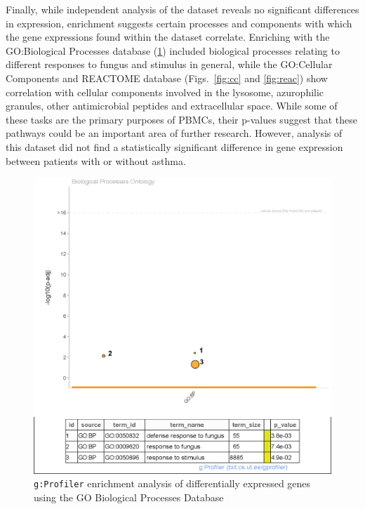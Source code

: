 \documentclass[pdflatex,sn-mathphys]{sn-jnl}%
\theoremstyle{thmstyleone}%
\theoremstyle{thmstyletwo}%
\newcommand{\betterref}[1]{\IfBeginWith{#1}{fig:}{Fig.~}{Table~}\ref{#1}}
\theoremstyle{thmstylethree}%
\begin{document}
\clearpage
Finally, while independent analysis of the dataset reveals no significant differences in expression, enrichment suggests certain processes and components with which the gene expressions found within the dataset correlate. Enriching with the GO:Biological Processes database \cite{ashburner2000gene} (\betterref{fig:bp}) included biological processes relating to different responses to fungus and stimulus in general, while the GO:Cellular Components and REACTOME database \cite{ashburner2000gene, fabregat2018reactome} (Figs.~\ref{fig:cc} and \ref{fig:reac}) show correlation with cellular components involved in the lysosome, azurophilic granules, other antimicrobial peptides and extracellular space. While some of these tasks are the primary purposes of PBMCs, their p-values suggest that these pathways could be an important area of further research. However, analysis of this dataset did not find a statistically significant difference in gene expression between patients with or without asthma.
\begin{figure}[h]
    \centering
    \includegraphics[scale=0.45]{plots/assn2/bp_onto_plot.eps}
    \caption{\texttt{g:Profiler} enrichment analysis of differentially expressed genes using the GO Biological Processes Database}
    \label{fig:bp}
\end{figure}
\end{document}
